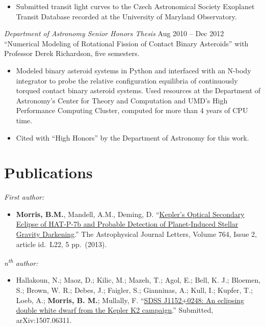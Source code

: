 \documentclass[margin]{res}
\begin{document}
\begin{resume}
\begin{itemize}
\item Submitted transit light curves to the Czech Astronomical Society Exoplanet Transit Database recorded at the University of Maryland Observatory.
\end{itemize} 

{\sl Department of Astronomy Senior Honors Thesis} \hfill Aug 2010 -- Dec 2012 \\
``Numerical Modeling of Rotational Fission of Contact Binary Asteroids'' with Professor Derek Richardson, five semesters. 
\begin{itemize}   
\item Modeled binary asteroid systems in Python and interfaced with an N-body integrator to probe the relative configuration equilibria of continuously torqued 
contact binary asteroid systems. Used resources at the Department of Astronomy's Center for Theory and Computation 
and UMD's High Performance Computing Cluster, computed for more than 4 years of CPU time. 
\item Cited with ``High Honors'' by the Department of Astronomy for this work.\\
\end{itemize}


\section{Publications}
\textit{First author:}
\begin{itemize}   
\item \textbf{Morris, B.M.}, Mandell, A.M., Deming, D. ``\href{http://adsabs.harvard.edu/abs/2013ApJ...764L..22M}{Kepler's Optical Secondary Eclipse of HAT-P-7b and Probable Detection of Planet-Induced Stellar Gravity Darkening}.'' The Astrophysical Journal Letters, Volume 764, Issue 2, article id.\ L22, 5 pp.\ (2013).
\end{itemize}
\textit{n\textsuperscript{th} author:}
\begin{itemize}   
\item Hallakoun, N.; Maoz, D.; Kilic, M.; Mazeh, T.; Agol, E.; Bell, K. J.; Bloemen, S.; Brown, W. R.; Debes, J.; Faigler, S.; Gianninas, A.; Kull, I.; Kupfer, T.; Loeb, A.; \textbf{Morris, B. M.}; Mullally, F. ``\href{http://adsabs.harvard.edu/abs/2015arXiv150706311H}{SDSS J1152+0248: An eclipsing double white dwarf from the Kepler K2 campaign}.'' Submitted, arXiv:1507.06311.\\
\end{itemize}


\end{resume}
\end{document}
